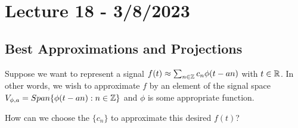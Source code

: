 \documentclass{article}
\begin{document}
\newpage
\section{Lecture 18 - 3/8/2023}

\subsection{Best Approximations and Projections}
Suppose we want to represent a signal $f(t) \approx \sum_{n \in \mathbb{Z}} c_n \phi(t - an)$ with $t \in \mathbb{R}$. In other words, we wish to approximate $f$ by an element of the signal space $V_{\phi, a} = Span\{\phi(t - an): n \in \mathbb{Z}\}$ and $\phi$ is some appropriate function.

\begin{question}
    How can we choose the $\{c_n\}$ to approximate this desired $f(t)$?
\end{question}
\end{document}
